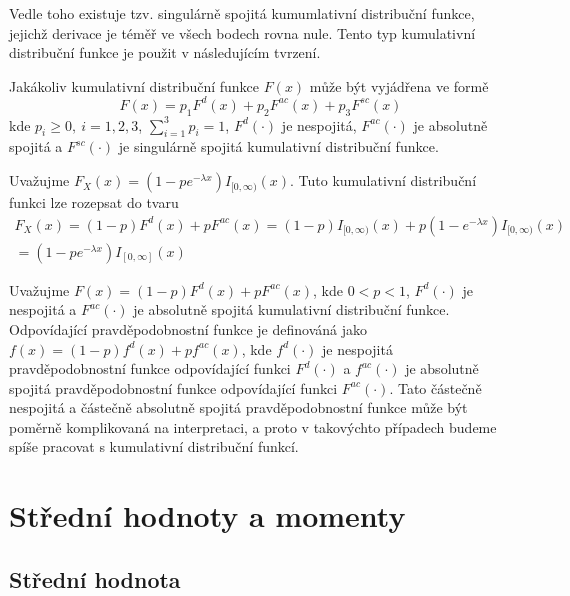 Vedle toho existuje tzv. singulárně spojitá kumumlativní distribuční funkce, jejichž derivace je téměř ve všech bodech rovna nule. Tento typ kumulativní distribuční funkce je použit v následujícím tvrzení.
\begin{corollary}
Jakákoliv kumulativní distribuční funkce $F(x)$ může být vyjádřena ve formě
\begin{equation*}
F(x) = p_1 F^d(x) + p_2 F^{ac}(x) + p_3 F^{sc}(x)
\end{equation*}
kde $p_i \ge 0,~i = 1, 2, 3$, $\sum_{i=1}^3p_i = 1$, $F^d(\cdot)$ je nespojitá, $F^{ac}(\cdot)$ je absolutně spojitá a $F^{sc}(\cdot)$ je singulárně spojitá kumulativní distribuční funkce.
\end{corollary}

\begin{example}
Uvažujme $F_X(x) = (1-pe^{-\lambda x})I_{[0, \infty)}(x)$. Tuto kumulativní distribuční funkci lze rozepsat do tvaru
\begin{gather*}
F_X(x) = (1-p)F^d(x) + pF^{ac}(x) = (1-p)I_{[0,\infty)}(x) + p(1-e^{-\lambda x})I_{[0,\infty)}(x)\\
= (1 - pe^{-\lambda x})I_{[0, \infty]}(x)
\end{gather*}
\end{example}

Uvažujme $F(x) = (1-p)F^d(x) + pF^{ac}(x)$, kde $0 < p < 1$, $F^d(\cdot)$ je nespojitá a $F^{ac}(\cdot)$ je absolutně spojitá kumulativní distribuční funkce. Odpovídající pravděpodobnostní funkce je definováná jako $f(x) = (1-p)f^d(x) + p f^{ac}(x)$, kde $f^d(\cdot)$ je nespojitá pravděpodobnostní funkce odpovídající funkci $F^{d}(\cdot)$ a $f^{ac}(\cdot)$ je absolutně spojitá pravděpodobnostní funkce odpovídající funkci $F^{ac}(\cdot)$. Tato částečně nespojitá a částečně absolutně spojitá pravděpodobnostní funkce může být poměrně komplikovaná na interpretaci, a proto v takovýchto případech budeme spíše pracovat s kumulativní distribuční funkcí.

\section{Střední hodnoty a momenty}

\subsection{Střední hodnota}

